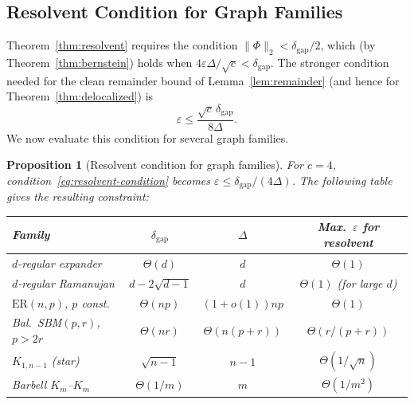 \documentclass[11pt]{article}
\newtheorem{proposition}[theorem]{Proposition}
\theoremstyle{definition}
\newcommand{\eps}{\varepsilon}
\begin{document}
\subsection{Resolvent Condition for Graph Families}\label{sec:resolvent-examples}

Theorem~\ref{thm:resolvent} requires the condition
$\|\Phi\|_2 < \delta_{\mathrm{gap}}/2$, which (by Theorem~\ref{thm:bernstein}) holds when
$4\eps\Delta/\sqrt{c} < \delta_{\mathrm{gap}}$.
The stronger condition needed for the clean remainder bound of Lemma~\ref{lem:remainder}
(and hence for Theorem~\ref{thm:delocalized}) is
\begin{equation}\label{eq:resolvent-condition}
\eps \leq \frac{\sqrt{c}\,\delta_{\mathrm{gap}}}{8\Delta}.
\end{equation}
We now evaluate this condition for several graph families.

\begin{proposition}[Resolvent condition for graph families]\label{prop:resolvent-families}
For $c = 4$, condition~\eqref{eq:resolvent-condition} becomes
$\eps \leq \delta_{\mathrm{gap}}/(4\Delta)$. The following table gives the resulting constraint:

\begin{center}
\begin{tabular}{@{}lccc@{}}
\toprule
Family & $\delta_{\mathrm{gap}}$ & $\Delta$ & Max.\ $\eps$ for resolvent \\
\midrule
$d$-regular expander & $\Theta(d)$ & $d$ & $\Theta(1)$ \\
$d$-regular Ramanujan & $d - 2\sqrt{d-1}$ & $d$ & $\Theta(1)$ (for large $d$) \\
$\mathrm{ER}(n,p)$, $p$ const.\ & $\Theta(np)$ & $(1+o(1))np$ & $\Theta(1)$ \\
Bal.\ SBM$(p,r)$, $p > 2r$ & $\Theta(nr)$ & $\Theta(n(p{+}r))$ & $\Theta(r/(p{+}r))$ \\
$K_{1,n-1}$ (star) & $\sqrt{n-1}$ & $n-1$ & $\Theta(1/\sqrt{n})$ \\
Barbell $K_m$--$K_m$ & $\Theta(1/m)$ & $m$ & $\Theta(1/m^2)$ \\
\bottomrule
\end{tabular}
\end{center}
\end{proposition}
\end{document}
